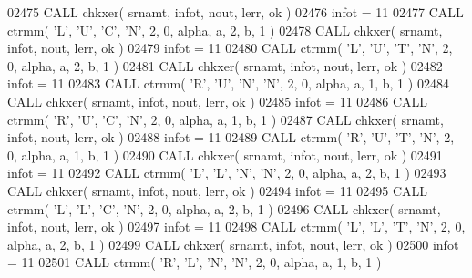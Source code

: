 \begin{DoxyCode}
02475       \textcolor{keyword}{CALL }chkxer( srnamt, infot, nout, lerr, ok )
02476       infot = 11
02477       \textcolor{keyword}{CALL }ctrmm( \textcolor{stringliteral}{'L'}, \textcolor{stringliteral}{'U'}, \textcolor{stringliteral}{'C'}, \textcolor{stringliteral}{'N'}, 2, 0, alpha, a, 2, b, 1 )
02478       \textcolor{keyword}{CALL }chkxer( srnamt, infot, nout, lerr, ok )
02479       infot = 11
02480       \textcolor{keyword}{CALL }ctrmm( \textcolor{stringliteral}{'L'}, \textcolor{stringliteral}{'U'}, \textcolor{stringliteral}{'T'}, \textcolor{stringliteral}{'N'}, 2, 0, alpha, a, 2, b, 1 )
02481       \textcolor{keyword}{CALL }chkxer( srnamt, infot, nout, lerr, ok )
02482       infot = 11
02483       \textcolor{keyword}{CALL }ctrmm( \textcolor{stringliteral}{'R'}, \textcolor{stringliteral}{'U'}, \textcolor{stringliteral}{'N'}, \textcolor{stringliteral}{'N'}, 2, 0, alpha, a, 1, b, 1 )
02484       \textcolor{keyword}{CALL }chkxer( srnamt, infot, nout, lerr, ok )
02485       infot = 11
02486       \textcolor{keyword}{CALL }ctrmm( \textcolor{stringliteral}{'R'}, \textcolor{stringliteral}{'U'}, \textcolor{stringliteral}{'C'}, \textcolor{stringliteral}{'N'}, 2, 0, alpha, a, 1, b, 1 )
02487       \textcolor{keyword}{CALL }chkxer( srnamt, infot, nout, lerr, ok )
02488       infot = 11
02489       \textcolor{keyword}{CALL }ctrmm( \textcolor{stringliteral}{'R'}, \textcolor{stringliteral}{'U'}, \textcolor{stringliteral}{'T'}, \textcolor{stringliteral}{'N'}, 2, 0, alpha, a, 1, b, 1 )
02490       \textcolor{keyword}{CALL }chkxer( srnamt, infot, nout, lerr, ok )
02491       infot = 11
02492       \textcolor{keyword}{CALL }ctrmm( \textcolor{stringliteral}{'L'}, \textcolor{stringliteral}{'L'}, \textcolor{stringliteral}{'N'}, \textcolor{stringliteral}{'N'}, 2, 0, alpha, a, 2, b, 1 )
02493       \textcolor{keyword}{CALL }chkxer( srnamt, infot, nout, lerr, ok )
02494       infot = 11
02495       \textcolor{keyword}{CALL }ctrmm( \textcolor{stringliteral}{'L'}, \textcolor{stringliteral}{'L'}, \textcolor{stringliteral}{'C'}, \textcolor{stringliteral}{'N'}, 2, 0, alpha, a, 2, b, 1 )
02496       \textcolor{keyword}{CALL }chkxer( srnamt, infot, nout, lerr, ok )
02497       infot = 11
02498       \textcolor{keyword}{CALL }ctrmm( \textcolor{stringliteral}{'L'}, \textcolor{stringliteral}{'L'}, \textcolor{stringliteral}{'T'}, \textcolor{stringliteral}{'N'}, 2, 0, alpha, a, 2, b, 1 )
02499       \textcolor{keyword}{CALL }chkxer( srnamt, infot, nout, lerr, ok )
02500       infot = 11
02501       \textcolor{keyword}{CALL }ctrmm( \textcolor{stringliteral}{'R'}, \textcolor{stringliteral}{'L'}, \textcolor{stringliteral}{'N'}, \textcolor{stringliteral}{'N'}, 2, 0, alpha, a, 1, b, 1 )

\end{DoxyCode}
